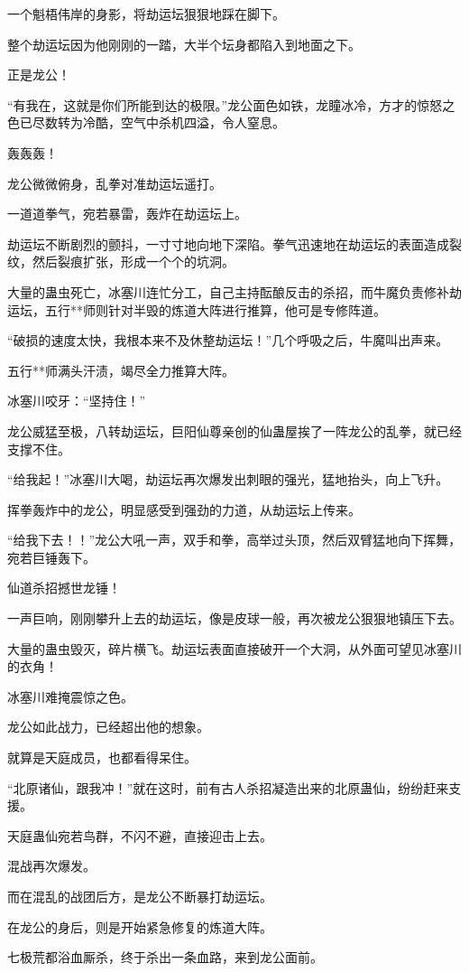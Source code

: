 \begin{this_body}
一个魁梧伟岸的身影，将劫运坛狠狠地踩在脚下。

整个劫运坛因为他刚刚的一踏，大半个坛身都陷入到地面之下。

正是龙公！

“有我在，这就是你们所能到达的极限。”龙公面色如铁，龙瞳冰冷，方才的惊怒之色已尽数转为冷酷，空气中杀机四溢，令人窒息。

轰轰轰！

龙公微微俯身，乱拳对准劫运坛遥打。

一道道拳气，宛若暴雷，轰炸在劫运坛上。

劫运坛不断剧烈的颤抖，一寸寸地向地下深陷。拳气迅速地在劫运坛的表面造成裂纹，然后裂痕扩张，形成一个个的坑洞。

大量的蛊虫死亡，冰塞川连忙分工，自己主持酝酿反击的杀招，而牛魔负责修补劫运坛，五行**师则针对半毁的炼道大阵进行推算，他可是专修阵道。

“破损的速度太快，我根本来不及休整劫运坛！”几个呼吸之后，牛魔叫出声来。

五行**师满头汗渍，竭尽全力推算大阵。

冰塞川咬牙：“坚持住！”

龙公威猛至极，八转劫运坛，巨阳仙尊亲创的仙蛊屋挨了一阵龙公的乱拳，就已经支撑不住。

“给我起！”冰塞川大喝，劫运坛再次爆发出刺眼的强光，猛地抬头，向上飞升。

挥拳轰炸中的龙公，明显感受到强劲的力道，从劫运坛上传来。

“给我下去！！”龙公大吼一声，双手和拳，高举过头顶，然后双臂猛地向下挥舞，宛若巨锤轰下。

仙道杀招撼世龙锤！

一声巨响，刚刚攀升上去的劫运坛，像是皮球一般，再次被龙公狠狠地镇压下去。

大量的蛊虫毁灭，碎片横飞。劫运坛表面直接破开一个大洞，从外面可望见冰塞川的衣角！

冰塞川难掩震惊之色。

龙公如此战力，已经超出他的想象。

就算是天庭成员，也都看得呆住。

“北原诸仙，跟我冲！”就在这时，前有古人杀招凝造出来的北原蛊仙，纷纷赶来支援。

天庭蛊仙宛若鸟群，不闪不避，直接迎击上去。

混战再次爆发。

而在混乱的战团后方，是龙公不断暴打劫运坛。

在龙公的身后，则是开始紧急修复的炼道大阵。

七极荒都浴血厮杀，终于杀出一条血路，来到龙公面前。


\end{this_body}
